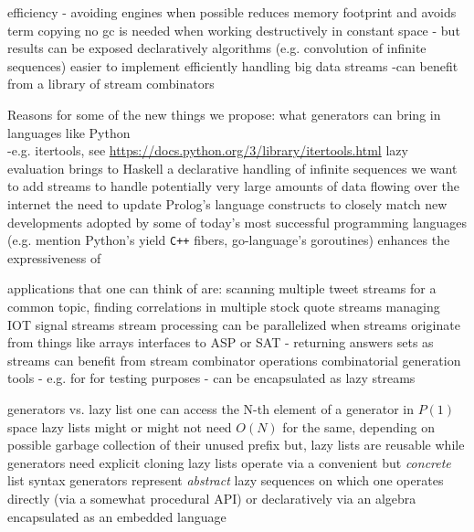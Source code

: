 \documentclass{new_tlp}
\begin{document}
\BI
 \I efficiency - avoiding engines when possible reduces memory footprint and avoids term copying
\I no gc is needed when working destructively in constant space - but results can be exposed declaratively
\I algorithms (e.g. convolution of infinite sequences) easier to implement efficiently
\I handling big data streams -can benefit from a library of stream combinators
\EI


Reasons for some of the new things we propose:
\BI
\I what generators can bring in languages like Python \\-e.g. itertools, 
see \url{https://docs.python.org/3/library/itertools.html}
\I lazy evaluation brings to Haskell a declarative handling of infinite sequences
\I we want to add streams to
handle potentially very large amounts of data flowing over the internet
\I the need to update Prolog's language constructs to closely match new developments adopted by some of today's most successful programming languages (e.g. mention Python's yield \verb~C++~ fibers, go-language's goroutines)
\EI
enhances the expressiveness of  

\BI
\I  applications that one can think of are:
\BI
\I scanning multiple tweet streams for a common topic, 
\I finding correlations in multiple stock quote streams 
\I managing IOT signal streams
\I stream processing  can be parallelized when streams originate from things like arrays
\I interfaces to ASP or SAT - returning answers sets as streams can benefit from stream combinator operations
\I combinatorial generation tools - e.g. for for testing purposes - can be encapsulated as lazy streams
\EI
\EI

\BI
{\Large
\I generators vs. lazy list
\BI
\I one  can access the N-th element of a  generator in $P(1)$ space
\I lazy lists might or might not need $O(N)$ for the same, depending on possible garbage collection of their unused prefix
\I but, lazy lists are reusable while generators need explicit cloning
\I lazy lists operate via a convenient but {\em concrete} list syntax
\I generators represent {\em abstract} lazy sequences on which one operates directly (via a somewhat procedural API) or declaratively via an algebra encapsulated as an embedded language
\EI
}

\end{document}
